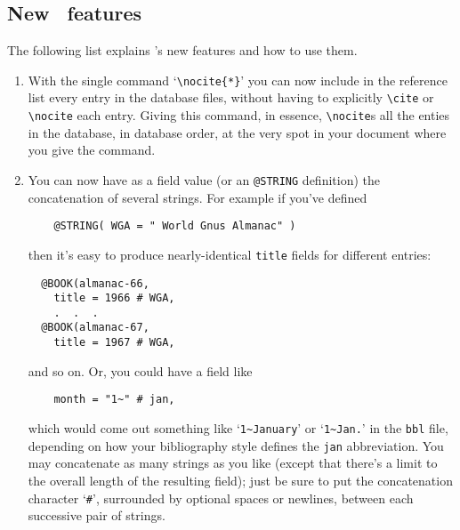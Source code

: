 \subsection{New \BibTeX\ features}
\label{features}

The following list explains \BibTeX's new features and how to use them.
\begin{enumerate}

\item
With the single command `\hbox{\verb|\nocite{*}|}'
you can now include in the reference list
every entry in the database files, without having to explicitly
\verb|\cite| or \hbox{\verb|\nocite|} each entry.
Giving this command, in essence,
\hbox{\verb|\nocite|}s
all the enties in the database, in database order,
at the very spot in your document
where you give the command.

\item
\label{concat}
You can now have as a field value (or an {\tt @STRING} definition)
the concatenation of several strings.
For example if you've defined
\begin{verbatim}
    @STRING( WGA = " World Gnus Almanac" )
\end{verbatim}
then it's easy to produce nearly-identical
{\tt title} fields for different entries:
\begin{verbatim}
  @BOOK(almanac-66,
    title = 1966 # WGA,
    .  .  .
  @BOOK(almanac-67,
    title = 1967 # WGA,
\end{verbatim}
and so on.  Or, you could have a field like
\begin{verbatim}
    month = "1~" # jan,
\end{verbatim}
which would come out something like
`\hbox{\verb|1~January|}' or `\hbox{\verb|1~Jan.|}' in the {\tt bbl} file,
depending on how your bibliography style defines
the {\tt jan} abbreviation.
You may concatenate as many strings as you like
(except that there's a limit to the overall length
of the resulting field);
just be sure to put the concatenation character `{\tt\#}'$\!$,
surrounded by optional spaces or newlines,
between each successive pair of strings.


\end{enumerate}
